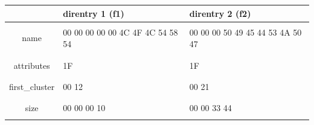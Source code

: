 \documentclass[11pt,a4paper]{article}
\begin{document}
\begin{table}[ht!]
  \centering
  \begin{minipage}{0.3\textwidth}
    \centering
%


  \end{minipage}
  \hfillx
  \begin{minipage}{0.65\textwidth}
    \centering

\begin{tabular}{ | c | C{4cm} | C{4cm} | }
\hline
 & direntry 1 (f1) & direntry 2 (f2) \\
\hline
 & & \\
name &  00 00 00 00 00 4C 4F 4C 54 58 54  &  00 00 00 50 49 45 44 53 4A 50 47  \\
 & & \\
\hline
 & & \\
attributes &  1F  &  1F  \\
 & & \\
\hline
 & & \\
first\_cluster &  00 12  &  00 21  \\
 & & \\
\hline
 & & \\
size &  00 00 00 10  &  00 00 33 44  \\
 & & \\
\hline
\end{tabular}

  \end{minipage}
\end{table}
\end{document}
